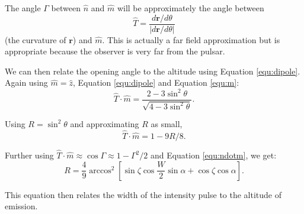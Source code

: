 The angle $\Gamma$ between $\hat{n}$ and $\hat{m}$
will be approximately the angle between 
\begin{equation}
\hat{T}=\frac{d\mathbf{r}/d\theta}{|d\mathbf{r}/d\theta|}
\end{equation}
(the curvature of $\mathbf{r}$) and $\hat{m}$.
This is actually a far field approximation 
but is appropriate because 
the observer is very far from the pulsar.

We can then relate the opening
angle to the altitude using Equation \ref{equ:dipole}.
Again using $\hat{m}=\hat{z}$, Equation \ref{equ:dipole} and Equation \ref{equ:m}:
\begin{equation}\hat{T}\cdot\hat{m}=\frac{2-3\sin^2\theta}{\sqrt{4-3\sin^2\theta}}.\end{equation}

Using $R=\sin^2\theta$ and approximating $R$ as small, 
\begin{equation}\hat{T}\cdot\hat{m}=1-9R/8.\end{equation}

Further using $\hat{T}\cdot\hat{m}\approx\cos{\Gamma}\approx 1-\Gamma^2/2$ and Equation \ref{equ:ndotm},
we get:
\begin{equation}
R=\frac{4}{9}\arccos^2\left[\sin{\zeta}\cos{\frac{W}{2}}\sin{\alpha}+\cos{\zeta}\cos{\alpha}\right]
.
\end{equation}

This equation then relates the width of the intensity pulse to the altitude of
emission.
